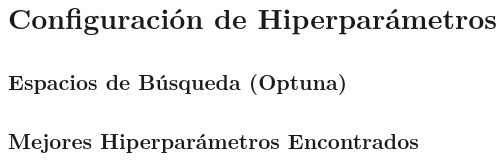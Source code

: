 
\chapter{Configuración de Hiperparámetros}


\section{Espacios de Búsqueda (Optuna)}

\section{Mejores Hiperparámetros Encontrados}
